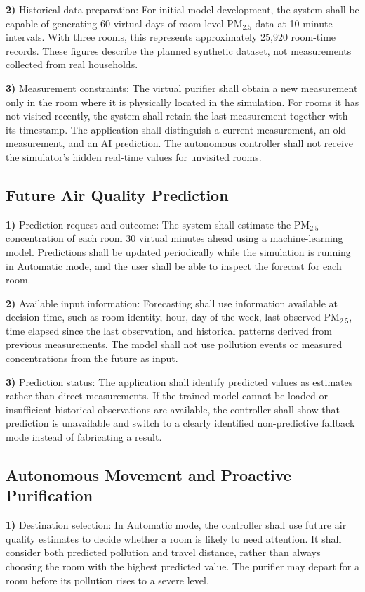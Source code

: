 \documentclass[conference]{IEEEtran}
\begin{document}
\par\noindent\textbf{2)} Historical data preparation:
For initial model development, the system shall be capable of generating 60 virtual days of room-level PM$_{2.5}$ data at 10-minute intervals. With three rooms, this represents approximately 25,920 room-time records. These figures describe the planned synthetic dataset, not measurements collected from real households.

\par\noindent\textbf{3)} Measurement constraints:
The virtual purifier shall obtain a new measurement only in the room where it is physically located in the simulation. For rooms it has not visited recently, the system shall retain the last measurement together with its timestamp. The application shall distinguish a current measurement, an old measurement, and an AI prediction. The autonomous controller shall not receive the simulator's hidden real-time values for unvisited rooms.

\subsection{Future Air Quality Prediction}
\par\noindent\textbf{1)} Prediction request and outcome:
The system shall estimate the PM$_{2.5}$ concentration of each room 30 virtual minutes ahead using a machine-learning model. Predictions shall be updated periodically while the simulation is running in Automatic mode, and the user shall be able to inspect the forecast for each room.

\par\noindent\textbf{2)} Available input information:
Forecasting shall use information available at decision time, such as room identity, hour, day of the week, last observed PM$_{2.5}$, time elapsed since the last observation, and historical patterns derived from previous measurements. The model shall not use pollution events or measured concentrations from the future as input.

\par\noindent\textbf{3)} Prediction status:
The application shall identify predicted values as estimates rather than direct measurements. If the trained model cannot be loaded or insufficient historical observations are available, the controller shall show that prediction is unavailable and switch to a clearly identified non-predictive fallback mode instead of fabricating a result.

\subsection{Autonomous Movement and Proactive Purification}
\par\noindent\textbf{1)} Destination selection:
In Automatic mode, the controller shall use future air quality estimates to decide whether a room is likely to need attention. It shall consider both predicted pollution and travel distance, rather than always choosing the room with the highest predicted value. The purifier may depart for a room before its pollution rises to a severe level.
\end{document}
